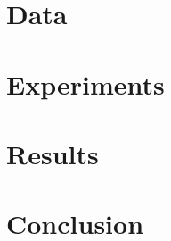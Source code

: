 \documentclass[11pt]{article}
\begin{document}
\section{Data}
\label{sec:data}


\section{Experiments}


\section{Results}


\section{Conclusion}


 


%
%
%
%
%
%
%
\end{document}
